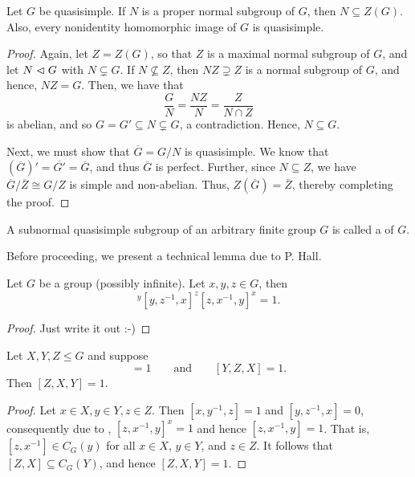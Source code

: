 \begin{lemma}
    Let $G$ be quasisimple. If $N$ is a proper normal subgroup of $G$, then $N\subseteq Z(G)$. Also, every nonidentity homomorphic image of $G$ is quasisimple.
\end{lemma}
\begin{proof}
    Again, let $Z = Z(G)$, so that $Z$ is a maximal normal subgroup of $G$, and let $N\vartriangleleft G$ with $N\subsetneq G$. If $N\not\subseteq Z$, then $NZ\supsetneq Z$ is a normal subgroup of $G$, and hence, $NZ = G$. Then, we have that 
    \begin{equation*}
        \frac{G}{N} = \frac{NZ}{N} = \frac{Z}{N\cap Z}
    \end{equation*}
    is abelian, and so $G = G'\subseteq N\subsetneq G$, a contradiction. Hence, $N\subseteq G$.

    Next, we must show that $\overline G = G/N$ is quasisimple. We know that $(\overline G)' = \overline{G'} = \overline G$, and thus $\overline G$ is perfect. Further, since $N\subseteq Z$, we have $\overline G/\overline Z\cong G/Z$ is simple and non-abelian. Thus, $Z(\overline G) = \overline Z$, thereby completing the proof.
\end{proof}

\begin{definition}
    A subnormal quasisimple subgroup of an arbitrary finite group $G$ is called a  of $G$.
\end{definition}

Before proceeding, we present a technical lemma due to P. Hall. 

\begin{lemma}[P. Hall]
    Let $G$ be a group (possibly infinite). Let $x,y,z\in G$, then 
    \begin{equation*}
        [x, y^{-1}, z]^y [y, z^{-1}, x]^{z} [z, x^{-1}, y]^{x} = 1.
    \end{equation*}
\end{lemma}
\begin{proof}
    Just write it out :-)
\end{proof}

\begin{lemma}
    Let $X, Y, Z\le G$ and suppose 
    \begin{equation*}
        [X, Y, Z] = 1\qquad\text{and}\qquad[Y, Z, X] = 1.
    \end{equation*}
    Then $[Z, X, Y] = 1$.
\end{lemma}
\begin{proof}
    Let $x\in X, y\in Y, z\in Z$. Then $[x, y^{-1}, z] = 1$ and $[y, z^{-1}, x] = 0$, consequently due to , $[z, x^{-1}, y]^{x} = 1$ and hence $[z, x^{-1}, y] = 1$. That is, $[z, x^{-1}]\in C_G(y)$ for all $x\in X$, $y\in Y$, and $z\in Z$. It follows that $[Z,X]\subseteq C_G(Y)$, and hence $[Z, X, Y] = 1$.
\end{proof}

